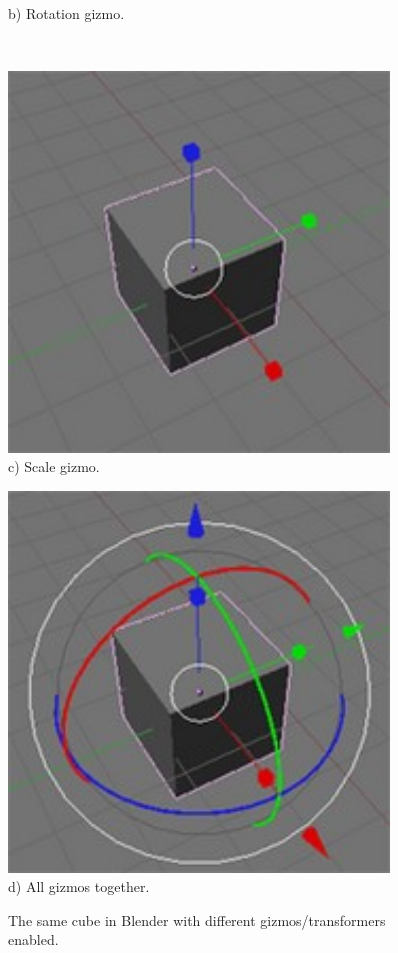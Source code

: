 \begin{figure}[htbp]
\begin{minipage}{.5\textwidth}
  	b) Rotation gizmo. \cite{blenderwiki}
  \end{minipage}\\
  \begin{minipage}{.5\textwidth}
    \centering
    \includegraphics[width=0.9\textwidth]{../assets/Manual-Manipulators-Scale.jpg}\\
  	c) Scale gizmo. \cite{blenderwiki}
  \end{minipage}
  \begin{minipage}{.5\textwidth}
    \centering
    \includegraphics[width=0.9\textwidth]{../assets/Manual-Manipulators-Combo.jpg}\\
  	d) All gizmos together. \cite{blenderwiki}
  \end{minipage}
  \caption{The same cube in Blender with different gizmos/transformers enabled.}
  \label{blender}
\end{figure}
